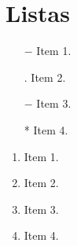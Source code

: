 \documentclass[12pt]{article} %
\begin{document}
\section{Listas}
\begin{itemize}
    \item [$-$] Item 1.
    \item [.] Item 2.
    \item [$-$] Item 3.
    \item [*] Item 4.
\end{itemize}

\begin{enumerate} [label=\alph*.] %
    \item  Item 1.
    \item  Item 2.
    \item  Item 3.
    \item  Item 4.
\end{enumerate}
\end{document}
